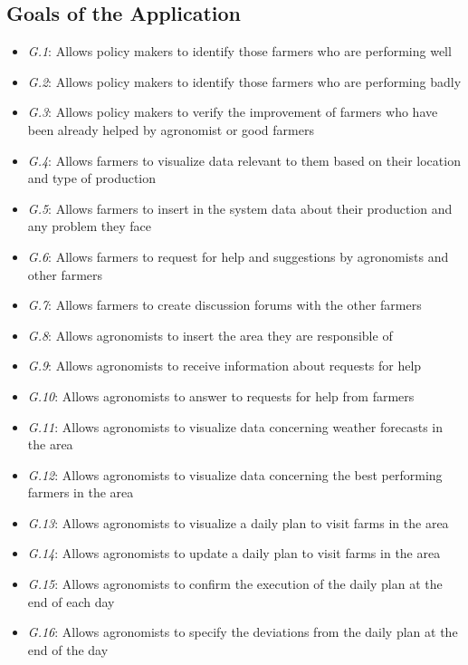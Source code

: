 \documentclass[a4paper,11pt]{report}
\begin{document}
\subsection{Goals of the Application}
\begin{itemize}
    \item \textit {G.1}: Allows policy makers to identify those farmers who are performing well
    \item \textit {G.2}: Allows policy makers to identify those farmers who are performing badly
    \item \textit {G.3}: Allows policy makers to verify the improvement of farmers who have been already helped by agronomist or good farmers
    \item \textit {G.4}: Allows farmers to visualize data relevant to them based on their location and type of production
    \item \textit {G.5}: {\color{red}  Allows farmers to insert in the system data about their production and any problem they face}
    \item \textit {G.6}: Allows farmers to request for help and suggestions by agronomists and other farmers
    \item \textit {G.7}: Allows farmers to create discussion forums with the other farmers
    \item \textit {G.8}: {\color{red}  Allows agronomists to insert the area they are responsible of}
    \item \textit {G.9}: {\color{red}  Allows agronomists to receive information about requests for help}
    \item \textit {G.10}: Allows agronomists to answer to requests for help from farmers
    \item \textit {G.11}: Allows agronomists to visualize data concerning weather forecasts in the area
    \item \textit {G.12}: Allows agronomists to visualize data concerning the best performing farmers in the area
    \item \textit {G.13}: Allows agronomists to visualize a daily plan to visit farms in the area
    \item \textit {G.14}: Allows agronomists to update a daily plan to visit farms in the area
    \item \textit {G.15}: Allows agronomists to confirm the execution of the daily plan at the end of each day 
    \item \textit {G.16}: Allows agronomists to specify the deviations from the daily plan at the end of the day

\end{itemize}
\end{document}

